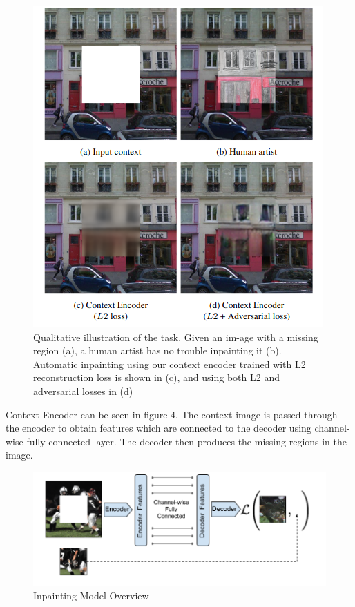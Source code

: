 \documentclass{article}
\begin{document}
\begin{figure}[H]
   \centering
   \includegraphics[width=0.8\linewidth]{figures/inpainting.png}
   \caption{ Qualitative illustration of the task.
   Given an im-age with a missing region (a),
   a human artist has no trouble inpainting  it  (b).
   Automatic  inpainting 
   using  our context encoder trained
   with L2 reconstruction loss
   is shown in (c),
   and using both L2 and adversarial losses in (d)}
   \end{figure}
 
   Context Encoder can be seen in figure 4.
   The context image is passed through
   the encoder to obtain features which are
   connected to the decoder using
   channel-wise fully-connected layer.
   The decoder then produces the missing regions in the image.
 
\begin{figure}[H]
       \centering
       \includegraphics[width=0.8\linewidth]{figures/inpaintin_model.png}
       \caption{ Inpainting Model Overview}
       \end{figure}
 
\end{document}
